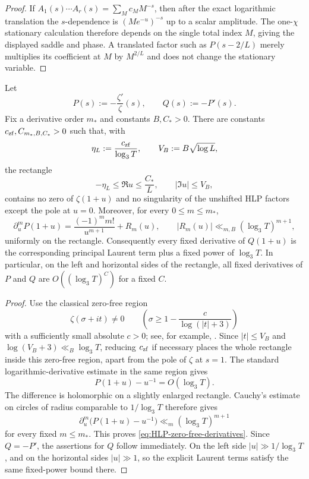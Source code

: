 \begin{proof}
If $A_1(s)\cdots A_r(s)=\sum_Mc_MM^{-s}$, then after the exact logarithmic
translation the $s$-dependence is $(Me^{-u})^{-s}$ up to a scalar amplitude.
The one-$\chi$ stationary calculation therefore depends on the single total
index $M$, giving the displayed saddle and phase. A translated factor such as
$P(s-2/L)$ merely multiplies its coefficient at $M$ by $M^{2/L}$ and does not
change the stationary variable. \end{proof}

\begin{lemma}
\label{lem:HLP-zero-free-derivatives}
Let
\[
P(s):=-\frac{\zeta'}{\zeta}(s),
\qquad
Q(s):=-P'(s).
\]
Fix a derivative order $m_*$ and constants $B,C_*>0$. There are constants
$c_{\rm zf},C_{m_*,B,C_*}>0$ such that, with
\[
\eta_L:=\frac{c_{\rm zf}}{\log_3T},
\qquad
V_B:=B\sqrt{\log L},
\]
the rectangle
\[
-\eta_L\le\Re u\le \frac{C_*}{L},
\qquad |\Im u|\le V_B,
\]
contains no zero of $\zeta(1+u)$ and no singularity of the unshifted HLP
factors except the pole at $u=0$. Moreover, for every $0\le m\le m_*$,
\begin{equation}
\boxed{
\partial_u^m P(1+u)
=\frac{(-1)^m m!}{u^{m+1}}+R_m(u),
\qquad
|R_m(u)|\ll_{m,B} (\log_3T)^{m+1},
}
\label{eq:HLP-zero-free-derivatives}
\end{equation}
uniformly on the rectangle. Consequently every fixed derivative of $Q(1+u)$
is the corresponding principal Laurent term plus a fixed power of
$\log_3T$. In particular, on the left and horizontal sides of the rectangle,
all fixed derivatives of $P$ and $Q$ are $O((\log_3T)^C)$ for a fixed $C$.
\end{lemma}

\begin{proof}
Use the classical zero-free region
\[
\zeta(\sigma+it)\ne0
\qquad
\left(\sigma\ge1-\frac{c}{\log(|t|+3)}\right)
\]
with a sufficiently small absolute $c>0$; see, for example,
\cite{Titchmarsh}. Since $|t|\le V_B$ and
$\log(V_B+3)\ll_B\log_3T$, reducing $c_{\rm zf}$ if necessary places the whole
rectangle inside this zero-free region, apart from the pole of $\zeta$ at
$s=1$. The standard logarithmic-derivative estimate in the same region gives
\[
P(1+u)-u^{-1}=O(\log_3T).
\]
The difference is holomorphic on a slightly enlarged rectangle. Cauchy's
estimate on circles of radius comparable to $1/\log_3T$ therefore gives
\[
\partial_u^m\bigl(P(1+u)-u^{-1}\bigr)
\ll_m(\log_3T)^{m+1}
\]
for every fixed $m\le m_*$. This proves
\eqref{eq:HLP-zero-free-derivatives}. Since $Q=-P'$, the assertions for $Q$
follow immediately. On the left side $|u|\gg1/\log_3T$, and on the horizontal
sides $|u|\gg1$, so the explicit Laurent terms satisfy the same fixed-power
bound there.
\end{proof}

